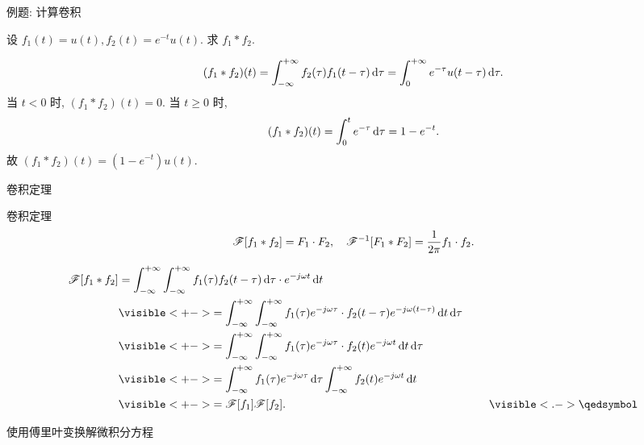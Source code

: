 \begin{frame}{例题: 计算卷积}
\begin{example}
设 $f_1(t)=u(t),f_2(t)=e^{-t}u(t)$.
求 $f_1\ast f_2$.
\end{example}
\begin{solution}
\vspace{-\baselineskip}
\[(f_1\ast f_2)(t)=\int_{-\infty}^{+\infty} f_2(\tau)f_1(t-\tau)\,\mathrm{d} \tau=\int_0^{+\infty} e^{-\tau}u(t-\tau)\,\mathrm{d} \tau.\]
\onslide<+->
当 $t<0$ 时, $(f_1\ast f_2)(t)=0$.
\onslide<+->
当 $t\ge0$ 时, 
\[(f_1\ast f_2)(t)=\int_0^t e^{-\tau}\,\mathrm{d} \tau=1-e^{-t}.\]
\onslide<+->
故 $(f_1\ast f_2)(t)=(1-e^{-t})u(t)$.
\end{solution}
\end{frame}


\begin{frame}{卷积定理}
\beqskip{0pt}
\begin{block}{卷积定理}
\[\mathscr{F}[f_1\ast f_2]=F_1\cdot F_2,\quad
\mathscr{F}^{-1}[F_1\ast F_2]=\frac1{2\pi}f_1\cdot f_2.\]
\vspace{-8pt}
\end{block}
\begin{proofs}
\begin{align*}
\msf[f_1\ast f_2]&=\int_{-\infty}^{+\infty}\int_{-\infty}^{+\infty}f_1(\tau)f_2(t-\tau)\diff \tau \cdot e^{-j\omega t}\diff t\\
&\visible<+->{=\int_{-\infty}^{+\infty}\int_{-\infty}^{+\infty}f_1(\tau)e^{-j\omega \tau}\cdot f_2(t-\tau)e^{-j\omega (t-\tau)}\diff t\diff \tau}\\
&\visible<+->{=\int_{-\infty}^{+\infty}\int_{-\infty}^{+\infty}f_1(\tau)e^{-j\omega \tau}\cdot f_2(t)e^{-j\omega t}\diff t\diff \tau}\\
&\visible<+->{=\int_{-\infty}^{+\infty}f_1(\tau)e^{-j\omega \tau}\diff\tau\int_{-\infty}^{+\infty}f_2(t)e^{-j\omega t}\diff t}\\
&\visible<+->{=\msf[f_1]\msf[f_2].}\hspace{180pt}\mqed
\end{align*}
\end{proofs}
\endgroup
\end{frame}


\begin{frame}{使用傅里叶变换解微积分方程}
\begin{center}
\end{center}
\end{frame}


